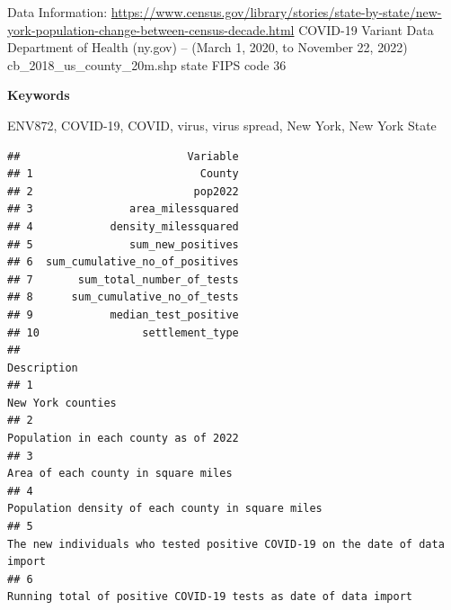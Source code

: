 \documentclass[
  12pt,
]{article}
\begin{document}
Data Information:
\url{https://www.census.gov/library/stories/state-by-state/new-york-population-change-between-census-decade.html}
COVID-19 Variant Data \textbar{} Department of Health (ny.gov) -- (March
1, 2020, to November 22, 2022) cb\_2018\_us\_county\_20m.shp state FIPS
code 36

\textbf{Keywords}

ENV872, COVID-19, COVID, virus, virus spread, New York, New York State

\begin{verbatim}
##                          Variable
## 1                          County
## 2                         pop2022
## 3               area_milessquared
## 4            density_milessquared
## 5               sum_new_positives
## 6  sum_cumulative_no_of_positives
## 7       sum_total_number_of_tests
## 8      sum_cumulative_no_of_tests
## 9            median_test_positive
## 10                settlement_type
##                                                                                                                                                                                                                                    Description
## 1                                                                                                                                                                                                                            New York counties
## 2                                                                                                                                                                                                         Population in each county as of 2022
## 3                                                                                                                                                                                                          Area of each county in square miles
## 4                                                                                                                                                                                            Population density of each county in square miles
## 5                                                                                                                                                                  The new individuals who tested positive COVID-19 on the date of data import
## 6                                                                                                                                                                              Running total of positive COVID-19 tests as date of data import

\end{verbatim}
\end{document}
